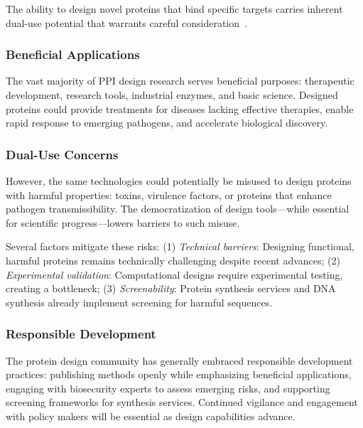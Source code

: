 The ability to design novel proteins that bind specific targets carries inherent dual-use potential that warrants careful consideration~\citep{nrc2004biotechnology}.

\subsubsection{Beneficial Applications}

The vast majority of PPI design research serves beneficial purposes: therapeutic development, research tools, industrial enzymes, and basic science. Designed proteins could provide treatments for diseases lacking effective therapies, enable rapid response to emerging pathogens, and accelerate biological discovery.

\subsubsection{Dual-Use Concerns}

However, the same technologies could potentially be misused to design proteins with harmful properties: toxins, virulence factors, or proteins that enhance pathogen transmissibility. The democratization of design tools---while essential for scientific progress---lowers barriers to such misuse.

Several factors mitigate these risks: (1) \textit{Technical barriers}: Designing functional, harmful proteins remains technically challenging despite recent advances; (2) \textit{Experimental validation}: Computational designs require experimental testing, creating a bottleneck; (3) \textit{Screenability}: Protein synthesis services and DNA synthesis already implement screening for harmful sequences.

\subsubsection{Responsible Development}

The protein design community has generally embraced responsible development practices: publishing methods openly while emphasizing beneficial applications, engaging with biosecurity experts to assess emerging risks, and supporting screening frameworks for synthesis services. Continued vigilance and engagement with policy makers will be essential as design capabilities advance.

